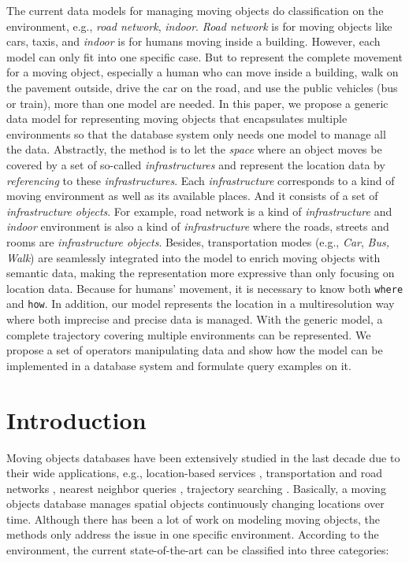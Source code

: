 \abstract{}
The current data models for managing moving objects do classification on the environment,
e.g., \textit{road network}, \textit{indoor}. \textit{Road network} is for
moving objects like cars, taxis, and \textit{indoor} is for humans moving inside a building. However,
each model can only fit into one specific case. But to represent the complete movement 
for a moving object, especially a human who can move inside a building, walk on the pavement outside, drive the car on the road, and 
use the public vehicles (bus or train), more than one model are needed. In this paper, we propose 
a generic data model for representing moving objects that encapsulates multiple environments 
so that the database system only needs one model to manage all the data. Abstractly, the 
method is to let the \textit{space} where an object moves be covered by a set of so-called 
\textit{infrastructures} and represent the location data by \textit{referencing} to these \textit{infrastructures}. 
Each \textit{infrastructure} corresponds to a kind of moving environment as well as its available 
places. And it consists of a set of \textit{infrastructure objects}. 
For example, road network is a kind of \textit{infrastructure} and \textit{indoor} environment 
is also a kind of \textit{infrastructure} where the roads, streets and rooms are 
\textit{infrastructure objects}. Besides, transportation modes (e.g., \textit{Car}, 
\textit{Bus, Walk}) are seamlessly integrated into the model to enrich moving objects with 
semantic data, making the representation more expressive than only focusing on location data. 
Because for humans' movement, it is necessary to know both \texttt{where} 
and \texttt{how}. In addition, our model represents the location in a multiresolution way where 
both imprecise and precise data is managed. With the generic model, a complete trajectory covering multiple environments can be represented. We propose a set of operators manipulating data and 
show how the model can be implemented in a database system and formulate query examples on it. 

\section{Introduction}
\label{sec:introduction}
Moving objects databases have been extensively studied in the last decade due to their wide 
applications, e.g., location-based services \cite{HJ2003,ZZPTT03,JKPT04}, 
transportation and road networks \cite{MYPM06,SJ2008,BSWC09,MLY10}, nearest neighbor queries \cite{TPS02,ISS03,MHP05,GBX2010}, trajectory searching \cite{COO05,JYZJS08,CSZZX2010}. Basically, 
a moving objects database manages spatial objects
continuously changing locations over time. Although there has been a lot of work 
\cite{PO+97,GBE+00,FG+00,HJ2003,SJ2003,GA2006} on modeling moving objects, 
the methods only address the issue in one specific environment. According to the environment, 
the current state-of-the-art can be classified into three categories: 

